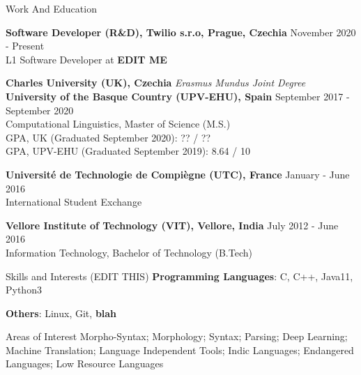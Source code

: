 \documentclass{resume} %
\begin{document}


    
\begin{rSection}{Work And Education}

    {\bf Software Developer (R\&D), Twilio s.r.o, Prague, Czechia} \hfill
        {November 2020 - Present}\\
            L1 Software Developer at \textbf{EDIT ME}
    
    {\bf Charles University (UK), Czechia} \hfill
        {\em Erasmus Mundus Joint Degree}\\
    {\bf University of the Basque Country (UPV-EHU), Spain} \hfill
        {September 2017 - September 2020}\\
            Computational Linguistics, Master of Science (M.S.)\\
            GPA, UK (Graduated September 2020): ?? / ??\\
            GPA, UPV-EHU (Graduated September 2019): 8.64 / 10
    
    {\bf Universit\'e de Technologie de Compi\`egne (UTC), France} \hfill
        {January - June 2016}\\
            International Student Exchange
    
    {\bf Vellore Institute of Technology (VIT), Vellore, India} \hfill
        {July 2012 - June 2016}\\
            Information Technology, Bachelor of Technology (B.Tech)

\end{rSection}


\begin{rSection}{Skills and Interests (EDIT THIS)}
    {\textbf{Programming Languages}: C, C++, Java11, Python3}
    
    {\textbf{Others}: Linux, Git, \textbf{blah}}
    
    \begin{rSubsection}{Areas of Interest}{}{}{}
        Morpho-Syntax; Morphology; Syntax; Parsing; Deep Learning; Machine Translation; 
        Language Independent Tools; Indic Languages; Endangered Languages; Low Resource 
        Languages
    \end{rSubsection}
\end{rSection}
\end{document}
